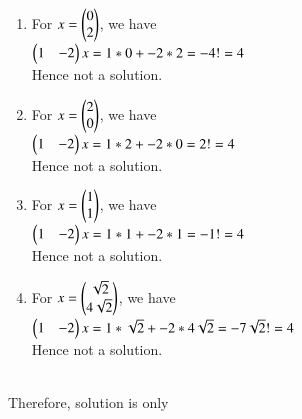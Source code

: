 \documentclass[journal,12pt,twocolumn]{IEEEtran}
\begin{document}
\begin{enumerate}
  \item For $x = \begin{pmatrix} 0\\
2
\end{pmatrix}$, we have \\$\begin{pmatrix}1 & -2\end{pmatrix}x = 1*0+-2*2=-4!=4$\\

Hence not a solution. \\

 \item For $x = \begin{pmatrix} 2\\
0
\end{pmatrix}$, we have \\$\begin{pmatrix}1 & -2\end{pmatrix}x = 1*2+-2*0=2!=4$\\

Hence not a solution.  \\

\item For $x = \begin{pmatrix} 1\\
1
\end{pmatrix}$, we have \\$\begin{pmatrix}1 & -2\end{pmatrix}x = 1*1+-2*1=-1!=4$\\

Hence not a solution. \\

\item For $x = \begin{pmatrix} \sqrt{2}\\
4\sqrt{2}
\end{pmatrix}$, we have \\$\begin{pmatrix}1 & -2\end{pmatrix}x = 1*\sqrt{2}+-2*4\sqrt{2}=-7\sqrt{2} !=4$\\

Hence not a solution. 
\end{enumerate}\\


Therefore, solution is  only 
\end{document}
